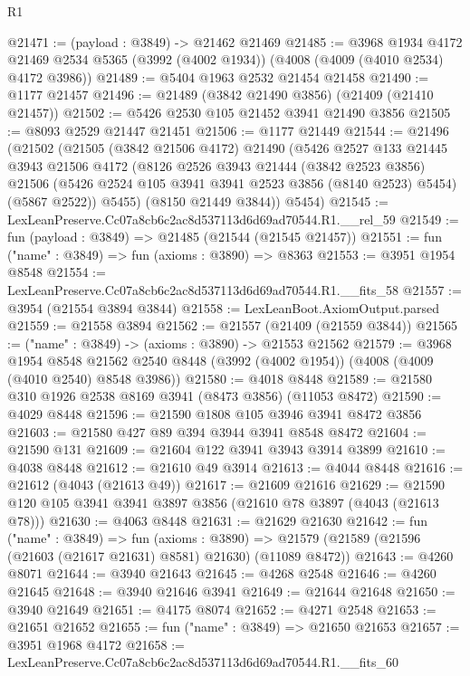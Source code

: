 \begin{lexlean}{R1}
\begin{coremodule}
@21471 := (payload : @3849) -> @21462 @21469
@21485 := @3968
    @1934
    @4172
    @21469
    @2534
    @5365
    (@3992 (@4002 @1934))
    (@4008 (@4009 (@4010 @2534) @4172 @3986))
@21489 := @5404 @1963 @2532 @21454 @21458
@21490 := @1177 @21457
@21496 := @21489 (@3842 @21490 @3856) (@21409 (@21410 @21457))
@21502 := @5426 @2530 @105 @21452 @3941 @21490 @3856
@21505 := @8093 @2529 @21447 @21451
@21506 := @1177 @21449
@21544 := @21496
    (@21502
      (@21505
        (@3842 @21506 @4172)
        @21490
        (@5426
          @2527
          @133
          @21445
          @3943
          @21506
          @4172
          (@8126
            @2526
            @3943
            @21444
            (@3842 @2523 @3856)
            @21506
            (@5426 @2524 @105 @3941 @3941 @2523 @3856 (@8140 @2523) @5454)
            (@5867 @2522))
          @5455)
        (@8150 @21449 @3844))
      @5454)
@21545 := LexLeanPreserve.Cc07a8cb6c2ac8d537113d6d69ad70544.R1.__rel_59
@21549 := fun (payload : @3849) => @21485 (@21544 (@21545 @21457))
@21551 := fun ("name" : @3849) => fun (axioms : @3890) => @8363
@21553 := @3951 @1954 @8548
@21554 := LexLeanPreserve.Cc07a8cb6c2ac8d537113d6d69ad70544.R1.__fits_58
@21557 := @3954 (@21554 @3894 @3844)
@21558 := LexLeanBoot.AxiomOutput.parsed
@21559 := @21558 @3894
@21562 := @21557 (@21409 (@21559 @3844))
@21565 := ("name" : @3849) -> (axioms : @3890) -> @21553 @21562
@21579 := @3968
    @1954
    @8548
    @21562
    @2540
    @8448
    (@3992 (@4002 @1954))
    (@4008 (@4009 (@4010 @2540) @8548 @3986))
@21580 := @4018 @8448
@21589 := @21580 @310 @1926 @2538 @8169 @3941 (@8473 @3856) (@11053 @8472)
@21590 := @4029 @8448
@21596 := @21590 @1808 @105 @3946 @3941 @8472 @3856
@21603 := @21580 @427 @89 @394 @3944 @3941 @8548 @8472
@21604 := @21590 @131
@21609 := @21604 @122 @3941 @3943 @3914 @3899
@21610 := @4038 @8448
@21612 := @21610 @49 @3914
@21613 := @4044 @8448
@21616 := @21612 (@4043 (@21613 @49))
@21617 := @21609 @21616
@21629 := @21590 @120 @105 @3941 @3941 @3897 @3856 (@21610 @78 @3897 (@4043 (@21613 @78)))
@21630 := @4063 @8448
@21631 := @21629 @21630
@21642 := fun ("name" : @3849) =>
  fun (axioms : @3890) =>
  @21579 (@21589 (@21596 (@21603 (@21617 @21631) @8581) @21630) (@11089 @8472))
@21643 := @4260 @8071
@21644 := @3940 @21643
@21645 := @4268 @2548
@21646 := @4260 @21645
@21648 := @3940 @21646 @3941
@21649 := @21644 @21648
@21650 := @3940 @21649
@21651 := @4175 @8074
@21652 := @4271 @2548
@21653 := @21651 @21652
@21655 := fun ("name" : @3849) => @21650 @21653
@21657 := @3951 @1968 @4172
@21658 := LexLeanPreserve.Cc07a8cb6c2ac8d537113d6d69ad70544.R1.__fits_60

\end{coremodule}
\end{lexlean}
